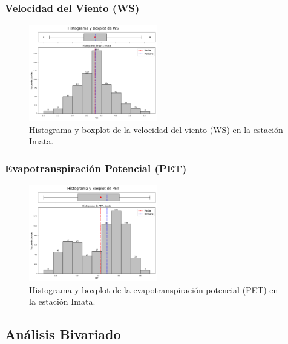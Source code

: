\subsubsection*{Velocidad del Viento (WS)}
\begin{figure}[H]
\centering
\includegraphics[width=0.5\textwidth]{resultados/por_estacion_meteorologica/Imata/WS_histograma.png}
\caption{Histograma y boxplot de la velocidad del viento (WS) en la estación Imata.}
\label{fig:imata_WS}
\end{figure}

\subsubsection*{Evapotranspiración Potencial (PET)}
\begin{figure}[H]
\centering
\includegraphics[width=0.5\textwidth]{resultados/por_estacion_meteorologica/Imata/PET_histograma.png}
\caption{Histograma y boxplot de la evapotranspiración potencial (PET) en la estación Imata.}
\label{fig:imata_PET}
\end{figure}

\subsection{Análisis Bivariado}

